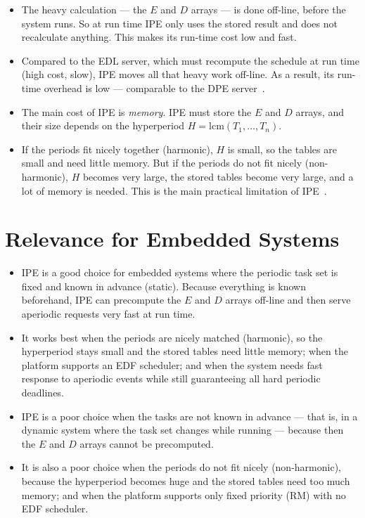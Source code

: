 \documentclass[conference]{IEEEtran}
\begin{document}
\begin{itemize}
  \item The heavy calculation --- the $E$ and $D$ arrays --- is done off-line,
        before the system runs. So at run time IPE only uses the stored result
        and does not recalculate anything. This makes its run-time cost low and
        fast.
  \item Compared to the EDL server, which must recompute the schedule at run
        time (high cost, slow), IPE moves all that heavy work off-line. As a
        result, its run-time overhead is low --- comparable to the DPE
        server~\cite{buttazzo}.
  \item The main cost of IPE is \emph{memory}. IPE must store the $E$ and $D$
        arrays, and their size depends on the hyperperiod
        $H = \mathrm{lcm}(T_1,\dots,T_n)$.
  \item If the periods fit nicely together (harmonic), $H$ is small, so the
        tables are small and need little memory. But if the periods do not fit
        nicely (non-harmonic), $H$ becomes very large, the stored tables become
        very large, and a lot of memory is needed. This is the main practical
        limitation of IPE~\cite{buttazzo}.
\end{itemize}

\section{Relevance for Embedded Systems}

\begin{itemize}
  \item IPE is a good choice for embedded systems where the periodic task set
        is fixed and known in advance (static). Because everything is known
        beforehand, IPE can precompute the $E$ and $D$ arrays off-line and then
        serve aperiodic requests very fast at run time.
  \item It works best when the periods are nicely matched (harmonic), so the
        hyperperiod stays small and the stored tables need little memory; when
        the platform supports an EDF scheduler; and when the system needs fast
        response to aperiodic events while still guaranteeing all hard periodic
        deadlines.
  \item IPE is a poor choice when the tasks are not known in advance --- that
        is, in a dynamic system where the task set changes while running ---
        because then the $E$ and $D$ arrays cannot be precomputed.
  \item It is also a poor choice when the periods do not fit nicely
        (non-harmonic), because the hyperperiod becomes huge and the stored
        tables need too much memory; and when the platform supports only fixed
        priority (RM) with no EDF scheduler.
\end{itemize}
\end{document}
